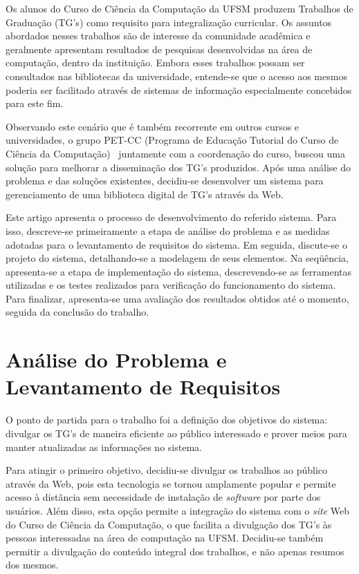 \documentclass[12pt]{article}
\newcommand{\software}{\textit{software}\xspace}
\newcommand{\site}{\textit{site}\xspace}
\begin{document}
Os alunos do Curso de Ci\^{e}ncia da Computa\c{c}\~{a}o da UFSM produzem Trabalhos de Gradua\c{c}\~{a}o (TG's) como requisito para integraliza\c{c}\~{a}o curricular. Os assuntos abordados nesses trabalhos s\~{a}o de interesse da comunidade acad\^{e}mica e geralmente apresentam resultados de pesquisas desenvolvidas na \'{a}rea de computa\c{c}\~{a}o, dentro da institui\c{c}\~{a}o. Embora esses trabalhos possam ser consultados nas bibliotecas da universidade, entende-se que o acesso aos mesmos poderia ser facilitado atrav\'{e}s de sistemas de informa\c{c}\~{a}o especialmente concebidos para este fim.

Observando este cen\'{a}rio que \'{e} tamb\'{e}m recorrente em outros cursos e universidades, o grupo PET-CC (Programa de Educa\c{c}\~{a}o Tutorial do Curso de Ci\^{e}ncia da Computa\c{c}\~{a}o)~\cite{sesu} juntamente com a coordena\c{c}\~{a}o do curso, buscou uma solu\c{c}\~{a}o para melhorar a dissemina\c{c}\~{a}o dos TG's produzidos. Ap\'{o}s uma an\'{a}lise do problema e das solu\c{c}\~{o}es existentes, decidiu-se desenvolver um sistema para gerenciamento de uma biblioteca digital de TG's atrav\'{e}s da Web.

Este artigo apresenta o processo de desenvolvimento do referido sistema. Para isso, descreve-se primeiramente a etapa de an\'{a}lise do problema e as medidas adotadas para o levantamento de requisitos do sistema. Em seguida, discute-se o projeto do sistema, detalhando-se a modelagem de seus elementos. Na seq\"{u}\^{e}ncia, apresenta-se a etapa de implementa\c{c}\~{a}o do sistema, descrevendo-se as ferramentas utilizadas e os testes realizados para verifica\c{c}\~{a}o do funcionamento do sistema. Para finalizar, apresenta-se uma avalia\c{c}\~{a}o dos resultados obtidos at\'{e} o momento, seguida da conclus\~{a}o do trabalho.


\section{An\'{a}lise do Problema e Levantamento de Requisitos}

O ponto de partida para o trabalho foi a defini\c{c}\~{a}o dos objetivos do sistema: divulgar os TG's de maneira eficiente ao p\'{u}blico interessado e prover meios para manter atualizadas as informa\c{c}\~{o}es no sistema.

Para atingir o primeiro objetivo, decidiu-se divulgar os trabalhos ao p\'{u}blico atrav\'{e}s da Web, pois esta tecnologia se tornou amplamente popular e permite acesso \`{a} dist\^{a}ncia sem necessidade de instala\c{c}\~{a}o de \software por parte dos usu\'{a}rios. Al\'{e}m disso, esta op\c{c}\~{a}o permite a integra\c{c}\~{a}o do sistema com o \site Web do Curso de Ci\^{e}ncia da Computa\c{c}\~{a}o, o que facilita a divulga\c{c}\~{a}o dos TG's \`{a}s pessoas interessadas na \'{a}rea de computa\c{c}\~{a}o na UFSM. Decidiu-se tamb\'{e}m permitir a divulga\c{c}\~{a}o do conte\'{u}do integral dos trabalhos, e n\~{a}o apenas resumos dos mesmos.
\end{document}
